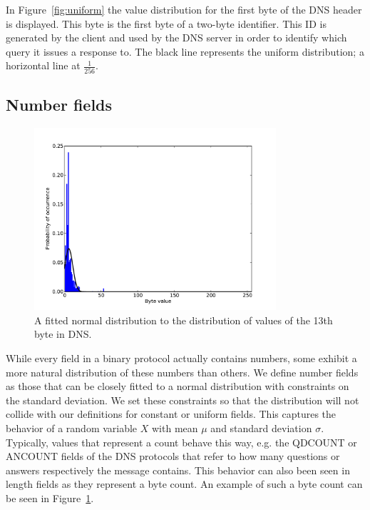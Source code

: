 \documentclass[a4paper]{report}
\begin{document}
In Figure~\ref{fig:uniform} the value distribution for the first byte of the
DNS header is displayed. This byte is the first byte of a two-byte identifier.
This ID is generated by the client and used by the DNS server in order to
identify which query it issues a response to. The black line represents the
uniform distribution; a horizontal line at $\frac{1}{256}$.

\newpage

\subsection{Number fields}

\begin{figure}[h]
    \centering
    \includegraphics[width=0.8\textwidth]{img/number}
    \captionsetup{width=0.8\textwidth}
    \caption{A fitted normal distribution to the distribution of values of the
    13th byte in DNS.}
    \label{fig:number}
\end{figure}

While every field in a binary protocol actually contains numbers, some exhibit
a more natural distribution of these numbers than others. We define number
fields as those that can be closely fitted to a normal distribution with
constraints on the standard deviation. We set these constraints so that the
distribution will not collide with our definitions for constant or uniform
fields. This captures the behavior of a random variable $X$ with mean $\mu$ and
standard deviation $\sigma$. Typically, values that represent a count behave
this way, e.g. the QDCOUNT or ANCOUNT fields of the DNS protocols that refer to
how many questions or answers respectively the message contains. This behavior
can also been seen in length fields as they represent a byte count. An example
of such a byte count can be seen in Figure~\ref{fig:number}.
\end{document}
